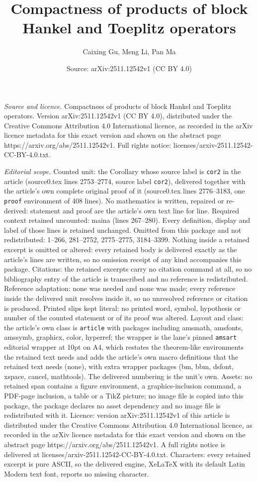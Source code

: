 \documentclass[10pt,a4paper]{amsart}
\title[Compactness of products of block Hankel and Toeplitz operato]{Compactness of products of block Hankel and Toeplitz operators}
\author{Caixing Gu, Meng Li, Pan Ma}
\date{Source: arXiv:2511.12542v1 (CC BY 4.0)}
\begin{document}
\maketitle

\noindent\emph{Source and licence.} Compactness of products of block Hankel and Toeplitz operators. Version arXiv:2511.12542v1 (CC BY 4.0), distributed under the Creative Commons Attribution 4.0 International licence, as recorded in the arXiv licence metadata for this exact version and shown on the abstract page https://arxiv.org/abs/2511.12542v1. Full rights notice: licenses/arxiv-2511.12542-CC-BY-4.0.txt.\par\smallskip

\noindent\textit{Editorial scope.} Counted unit: the Corollary whose source label is \texttt{cor2} in the article (source0.tex lines 2753--2774, source label \texttt{cor2}), delivered together with the article's own complete original proof of it (source0.tex lines 2776--3183, one \texttt{proof} environment of 408 lines). No mathematics is written, repaired or re-derived: statement and proof are the article's own text line for line. Required context retained uncounted: maina (lines 267--280). Every definition, display and label of those lines is retained unchanged. Omitted from this package and not redistributed: 1--266, 281--2752, 2775--2775, 3184--3399. Nothing inside a retained excerpt is omitted or altered: every retained body is delivered exactly as the article's lines are written, so no omission receipt of any kind accompanies this package. Citations: the retained excerpts carry no citation command at all, so no bibliography entry of the article is transcribed and no reference is redistributed. Reference adaptation: none was needed and none was made; every reference inside the delivered unit resolves inside it, so no unresolved reference or citation is produced. Printed slips kept literal: no printed word, symbol, hypothesis or number of the counted statement or of its proof was altered. Layout and class: the article's own class is \texttt{article} with packages including amsmath, amsfonts, amssymb, graphicx, color, hyperref; the wrapper is the lane's pinned \texttt{amsart} editorial wrapper at 10pt on A4, which restates the theorem-like environments the retained text needs and adds the article's own macro definitions that the retained text needs (none), with extra wrapper packages (bm, bbm, dsfont, xspace, cancel, mathtools). The delivered numbering is the unit's own. Assets: no retained span contains a figure environment, a graphics-inclusion command, a PDF-page inclusion, a table or a TikZ picture; no image file is copied into this package, the package declares no asset dependency and no image file is redistributed with it. Licence: version arXiv:2511.12542v1 of this article is distributed under the Creative Commons Attribution 4.0 International licence, as recorded in the arXiv licence metadata for this exact version and shown on the abstract page https://arxiv.org/abs/2511.12542v1. A full rights notice is delivered at licenses/arxiv-2511.12542-CC-BY-4.0.txt. Characters: every retained excerpt is pure ASCII, so the delivered engine, XeLaTeX with its default Latin Modern text font, reports no missing character.
\end{document}
